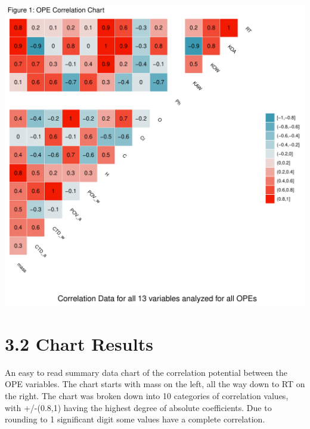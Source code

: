 \documentclass[journal=jacsat,manuscript=article]{achemso}
\begin{document}
\includegraphics{Rahmi_Chowdhury_500621744_Final_project_files/figure-latex/unnamed-chunk-3-1.pdf}

\hypertarget{chart-results}{%
\section{3.2 Chart Results}\label{chart-results}}

An easy to read summary data chart of the correlation potential between
the OPE variables. The chart starts with mass on the left, all the way
down to RT on the right. The chart was broken down into 10 categories of
correlation values, with +/-(0.8,1) having the highest degree of
absolute coefficients. Due to rounding to 1 significant digit some
values have a complete correlation.
\end{document}
